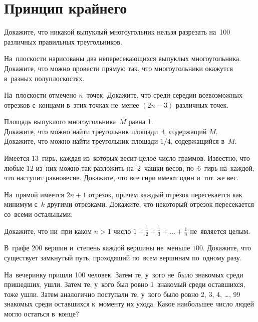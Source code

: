 
\section*{Принцип крайнего}


\begin{problems}

\item
Докажите, что никакой выпуклый многоугольник нельзя разрезать на~100 различных
правильных треугольников.

\item
На~плоскости нарисованы два непересекающихся выпуклых многоугольника.
Докажите, что можно провести прямую так, что многоугольники окажутся в~разных
полуплоскостях.

\item
На~плоскости отмечено $n$~точек.
Докажите, что среди середин всевозможных отрезков с~концами в~этих точках
не~менее $(2 n - 3)$ различных точек.

\item
Площадь выпуклого многоугольника~$M$ равна 1.
\\
\subproblem
Докажите, что можно найти треугольник площади~$4$, содержащий $M$.
\\
\subproblem
Докажите, что можно найти треугольник площади $1 / 4$, содержащийся в~$M$.

\item
Имеется $13$~гирь, каждая из~которых весит целое число граммов.
Известно, что любые $12$ из~них можно так разложить на~$2$~чашки весов,
по~$6$~гирь на~каждой, что наступит равновесие.
Докажите, что все гири имеют один и~тот~же вес.

\item
На~прямой имеется $2 n + 1$ отрезок, причем каждый отрезок пересекается как
минимум с~$k$ другими отрезками.
Докажите, что некоторый отрезок пересекается со~всеми остальными.

\item
Докажите, что ни~при каком $n > 1$ число
\(
    1 + \frac{1}{2} + \frac{1}{3} + \ldots + \frac{1}{n}
\)
не~является целым.

\item
В~графе $200$ вершин и~степень каждой вершины не~меньше $100$.
Докажите, что существует замкнутый путь, проходящий по~всем вершинам по~одному
разу.

\item
На~вечеринку пришли 100 человек.
Затем те, у~кого не~было знакомых среди пришедших, ушли.
Затем те, у~кого был ровно 1~знакомый среди оставшихся, тоже ушли.
Затем аналогично поступали те, у~кого было ровно 2, 3, 4, \ldots, 99
знакомых среди оставшихся к~моменту их ухода.
Какое наибольшее число людей могло остаться в~конце?

\end{problems}

